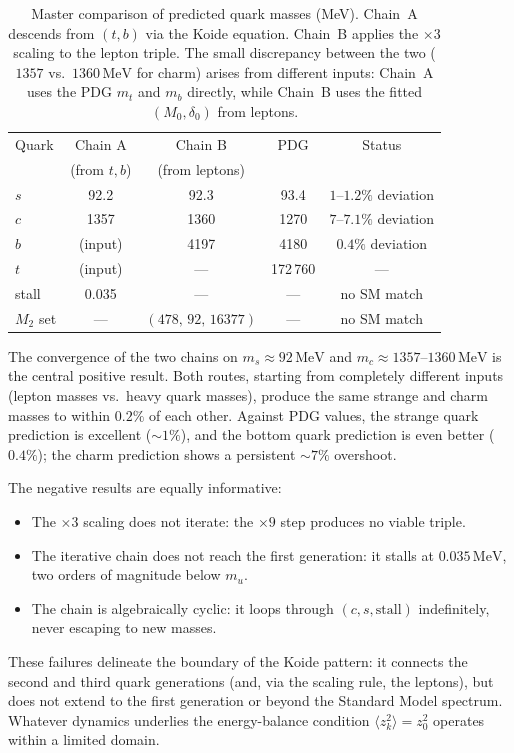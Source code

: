 \documentclass[12pt,a4paper]{article}
\newcommand{\MeV}{\,\text{MeV}}
\begin{document}
\begin{table}[ht]
\centering
\caption{Master comparison of predicted quark masses (MeV). Chain~A
descends from $(t,b)$ via the Koide equation. Chain~B applies
the $\times 3$ scaling to the lepton triple. The small discrepancy
between the two ($1357$ vs.\ $1360\MeV$ for charm) arises from
different inputs: Chain~A uses the PDG $m_t$ and $m_b$ directly,
while Chain~B uses the fitted $(M_0, \delta_0)$ from leptons.}
\label{tab:master}
\begin{tabular}{lcccc}
\toprule
Quark & Chain A & Chain B & PDG & Status \\
 & (from $t,b$) & (from leptons) & & \\
\midrule
$s$ & 92.2 & 92.3 & 93.4 & $1\text{--}1.2\%$ deviation \\
$c$ & 1357 & 1360 & 1270 & $7\text{--}7.1\%$ deviation \\
$b$ & (input) & 4197 & 4180 & $0.4\%$ deviation \\
$t$ & (input) & --- & 172\,760 & --- \\
stall & 0.035 & --- & --- & no SM match \\
$M_2$ set & --- & $(478,\,92,\,16377)$ & --- & no SM match \\
\bottomrule
\end{tabular}
\end{table}

The convergence of the two chains on $m_s \approx 92\MeV$ and
$m_c \approx 1357\text{--}1360\MeV$ is the central positive result.
Both routes, starting from completely different inputs (lepton masses
vs.\ heavy quark masses), produce the same strange and charm masses
to within $0.2\%$ of each other. Against PDG values, the strange
quark prediction is excellent ($\sim 1\%$), and the bottom quark
prediction is even better ($0.4\%$); the charm prediction shows a
persistent $\sim 7\%$ overshoot.

The negative results are equally informative:
\begin{itemize}
\item The $\times 3$ scaling does not iterate: the $\times 9$ step
produces no viable triple.
\item The iterative chain does not reach the first generation: it
stalls at $0.035\MeV$, two orders of magnitude below $m_u$.
\item The chain is algebraically cyclic: it loops through
$(c, s, \text{stall})$ indefinitely, never escaping to new masses.
\end{itemize}
These failures delineate the boundary of the Koide pattern: it
connects the second and third quark generations (and, via the
scaling rule, the leptons), but does not extend to the first
generation or beyond the Standard Model spectrum. Whatever
dynamics underlies the energy-balance condition
$\langle z_k^2\rangle = z_0^2$ operates within a limited domain.
\end{document}

